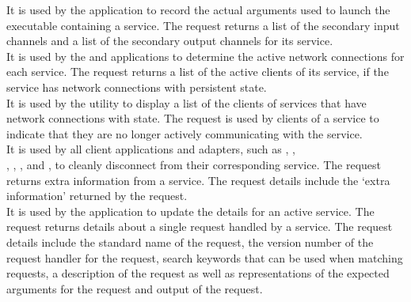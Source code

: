 It is used by the \emph{\MMMU} application to record the actual arguments used to launch
the executable containing a service.
The  request returns a list of the secondary input
channels and a list of the secondary output channels for its service.\\

It is used by the  and \emph{\MMMU} applications to
determine the active \yarp{} network connections for each service.
The  request returns a list of the active clients of
its service, if the service has \yarp{} network connections with persistent state.\\

It is used by the  utility to display a list of the clients
of services that have \yarp{} network connections with state.
The  request is used by clients of a service to
indicate that they are no longer actively communicating with the service.\\

It is used by all client applications and adapters, such as
,
,\\
, ,
,
 and
, to cleanly disconnect from their
corresponding service.
The  request returns extra information from a
service.
The request details include the `extra information' returned by the
 request.\\

It is used by the \emph{\MMMU} application to update the details for an active service.
The  request returns details about a single request
handled by a service.
The request details include the standard name of the request, the version number of the
request handler for the request, search keywords that can be used when matching requests,
a description of the request as well as representations of the expected arguments for the
request and output of the request.\\

